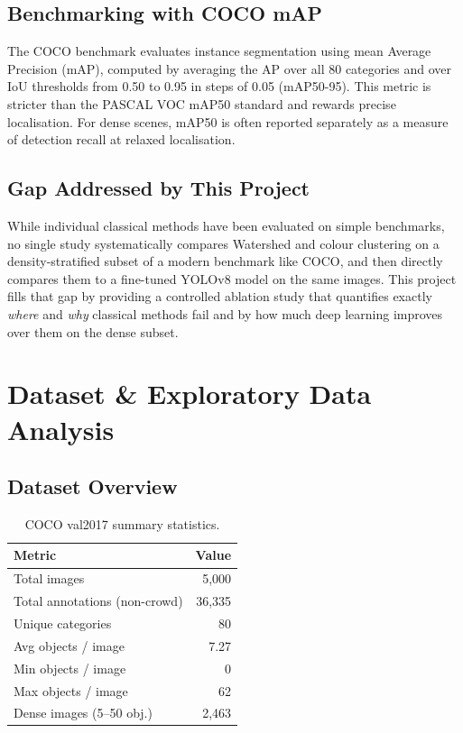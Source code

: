 \documentclass[12pt, a4paper]{article}
\begin{document}
\subsection{Benchmarking with COCO mAP}
The COCO benchmark evaluates instance segmentation using mean Average
Precision (mAP), computed by averaging the AP over all 80 categories and over
IoU thresholds from 0.50 to 0.95 in steps of 0.05 (mAP50-95).  This metric
is stricter than the PASCAL VOC mAP50 standard and rewards precise
localisation.  For dense scenes, mAP50 is often reported separately as a
measure of detection recall at relaxed localisation.

\subsection{Gap Addressed by This Project}
While individual classical methods have been evaluated on simple
benchmarks, no single study systematically compares Watershed and colour
clustering on a density-stratified subset of a modern benchmark like COCO,
and then directly compares them to a fine-tuned YOLOv8 model on the same
images.  This project fills that gap by providing a controlled ablation study
that quantifies exactly \emph{where} and \emph{why} classical methods fail
and by how much deep learning improves over them on the dense subset.

\section{Dataset \& Exploratory Data Analysis}

\subsection{Dataset Overview}

\begin{table}[H]
\centering
\caption{COCO val2017 summary statistics.}
\label{tab:dataset}
\begin{tabular}{lr}
\toprule
\textbf{Metric}             & \textbf{Value} \\
\midrule
Total images                & 5,000          \\
Total annotations (non-crowd) & 36,335       \\
Unique categories           & 80             \\
Avg objects / image         & 7.27           \\
Min objects / image         & 0              \\
Max objects / image         & 62             \\
Dense images (5–50 obj.)    & 2,463          \\
\bottomrule
\end{tabular}
\end{table}
\end{document}
